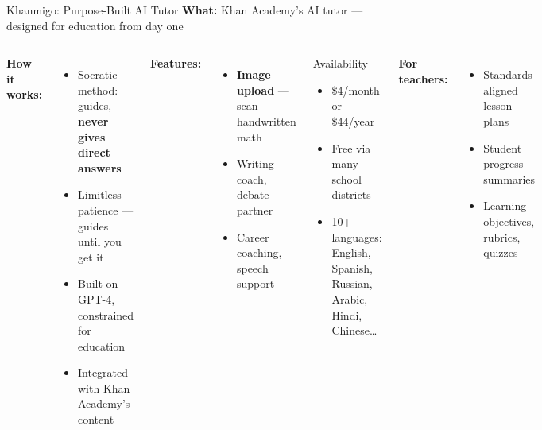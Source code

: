 \documentclass[aspectratio=169]{beamer}
\begin{document}
\begin{frame}{Khanmigo: Purpose-Built AI Tutor}
\small
\textbf{\color{popblue}What:} Khan Academy's AI tutor --- designed for education from day one

\smallskip
\begin{columns}[T]
\textbf{How it works:}
\begin{itemize}\setlength\itemsep{0em}
  \item Socratic method: guides, \textbf{never gives direct answers}
  \item Limitless patience --- guides until you get it
  \item Built on GPT-4, constrained for education
  \item Integrated with Khan Academy's content
\end{itemize}

\smallskip
\textbf{Features:}
\begin{itemize}\setlength\itemsep{0em}
  \item \textbf{Image upload} --- scan handwritten math
  \item Writing coach, debate partner
  \item Career coaching, speech support
\end{itemize}

\begin{exampleblock}{Availability}
\begin{itemize}\setlength\itemsep{0em}
  \item \$4/month or \$44/year
  \item Free via many school districts
  \item 10+ languages: English, Spanish, Russian, Arabic, Hindi, Chinese\ldots
\end{itemize}
\end{exampleblock}

\smallskip
\textbf{\color{popblue}For teachers:}
\begin{itemize}\setlength\itemsep{0em}
  \item Standards-aligned lesson plans
  \item Student progress summaries
  \item Learning objectives, rubrics, quizzes
\end{itemize}
\end{columns}
\end{frame}
\end{document}
